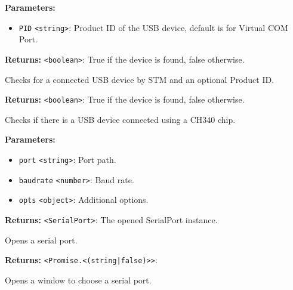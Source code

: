 \documentclass[12pt,a4paper]{article}
\begin{document}
\noindent \textbf{Parameters:}
\begin{itemize}
  \item \texttt{PID} \texttt{<string>}: Product ID of the USB device, default is for Virtual COM Port.
\end{itemize}

\noindent \textbf{Returns:} \texttt{<boolean>}: True if the device is found, false otherwise.

\noindent Checks for a connected USB device by STM and an optional Product ID.

\vspace{5mm}
\noindent {}


\noindent \textbf{Returns:} \texttt{<boolean>}: True if the device is found, false otherwise.

\noindent Checks if there is a USB device connected using a CH340 chip.

\vspace{5mm}
\noindent {}


\noindent \textbf{Parameters:}
\begin{itemize}
  \item \texttt{port} \texttt{<string>}: Port path.
  \item \texttt{baudrate} \texttt{<number>}: Baud rate.
  \item \texttt{opts} \texttt{<object>}: Additional options.
\end{itemize}

\noindent \textbf{Returns:} \texttt{<SerialPort>}: The opened SerialPort instance.

\noindent Opens a serial port.

\vspace{5mm}
\noindent {}


\noindent \textbf{Returns:} \texttt{<Promise.<(string|false)>>}:

\noindent Opens a window to choose a serial port.

\vspace{5mm}
\noindent {}
\end{document}
